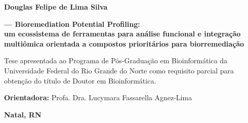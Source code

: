 \begin{titlepage}
\begin{center}
\textbf{Douglas Felipe de Lima Silva}
\vfill

{\Large \textbf{\biorempp{} --- Bioremediation Potential Profiling:}} \\
\vspace{0.3cm}
{\large \textbf{um ecossistema de ferramentas para análise funcional e integração multiômica orientada a compostos prioritários para biorremediação}}
\vfill

\begin{flushright}
\begin{minipage}{0.6\textwidth}
Tese apresentada ao Programa de Pós-Graduação em Bioinformática da Universidade Federal do Rio Grande do Norte como requisito parcial para obtenção do título de Doutor em Bioinformática.

\vspace{0.5cm}
\textbf{Orientadora:} Profa. Dra. Lucymara Fassarella Agnez-Lima \\
\end{minipage}
\end{flushright}

\vfill

\textbf{Natal, RN} \\
\textbf{\the\year}
\end{center}
\end{titlepage}

